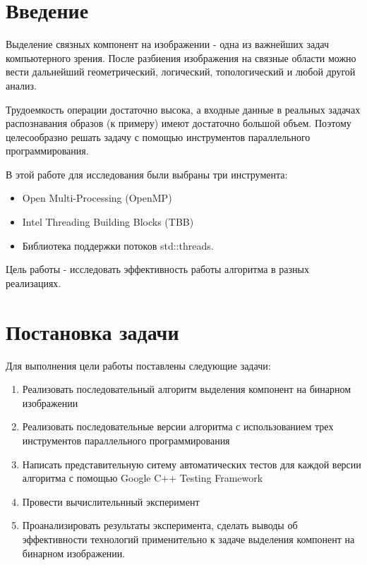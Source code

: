 \documentclass{report}
\begin{document}
\setcounter{page}{2}

\tableofcontents
\newpage

\section*{Введение}

Выделение связных компонент на изображении - одна из важнейших задач компьютерного зрения. После разбиения изображения на связные области можно вести дальнейший  геометрический, логический, топологический и любой другой анализ.
\par Трудоемкость операции достаточно высока, а входные данные в реальных задачах распознавания образов (к примеру) имеют достаточно большой объем. Поэтому целесообразно решать задачу с помощью инструментов параллельного программирования.
\par В этой работе для исследования были выбраны три инструмента:
\begin{itemize}
	\item Open Multi-Processing (OpenMP)
	\item Intel Threading Building Blocks (TBB)
	\item Библиотека поддержки потоков std::threads.
\end{itemize}
\par Цель работы - исследовать эффективность работы алгоритма в разных реализациях.

\newpage

\section*{Постановка задачи}

Для выполнения цели работы поставлены следующие задачи:

\begin{enumerate} 

\item Реализовать последовательный алгоритм выделения компонент на бинарном изображении
\item Реализовать последовательные версии алгоритма с использованием трех инструментов параллельного программирования
\item Написать представительную ситему автоматических тестов для каждой версии алгоритма с помощью Google C++ Testing Framework
\item Провести вычислительнный эксперимент
\item Проанализировать результаты эксперимента, сделать выводы об эффективности технологий применительно к задаче выделения компонент на бинарном изображении.

\end{enumerate} 
\end{document}
